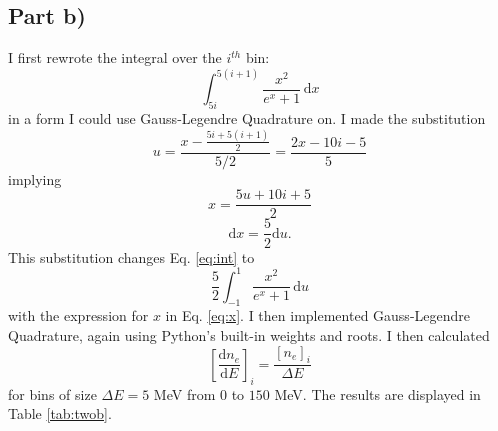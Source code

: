 \documentclass[11pt,letterpaper]{article}
\begin{document}
\subsection{Part b)}
I first rewrote the integral over the $i^{th}$ bin:
\begin{equation}\label{eq:int}
\int_{5i}^{5(i+1)}\!\frac{x^2}{e^{x}+1}\,\mathrm{d}x
\end{equation}
in a form I could use Gauss-Legendre Quadrature on.  I made the substitution
\begin{equation}
u=\frac{x-\frac{5i+5(i+1)}{2}}{5/2}=\frac{2x-10i-5}{5}
\end{equation}
implying
\begin{equation}\label{eq:x}
x=\frac{5u+10i+5}{2}
\end{equation}
\begin{equation}
\mathrm{d}x=\frac{5}{2}\mathrm{d}u.
\end{equation}
This substitution changes Eq. \ref{eq:int} to
\begin{equation}
\frac{5}{2}\int_{-1}^{1}\!\frac{x^2}{e^{x}+1}\,\mathrm{d}u
\end{equation}
with the expression for $x$ in Eq. \ref{eq:x}.  I then implemented 
Gauss-Legendre Quadrature, again using Python's built-in weights and roots.  
I then calculated 
\begin{equation}
\left[\frac{\mathrm{d}n_e}{\mathrm{d}E}\right]_i=\frac{[n_e]_i}{\Delta E}
\end{equation}
for bins of size $\Delta E=5$ MeV from $0$ to $150$ MeV.  The results are displayed 
in Table \ref{tab:twob}.
\end{document}
